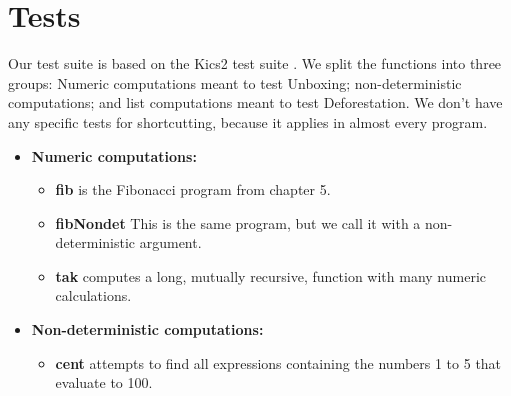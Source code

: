 \documentclass{book}
\theoremstyle{definition}
\begin{document}
\section{Tests}

Our test suite is based on the Kics2 test suite \cite{kics2}.
We split the functions into three groups:
Numeric computations meant to test Unboxing;
non-deterministic computations;
and list computations meant to test Deforestation.
We don't have any specific tests for shortcutting, because it
applies in almost every program.

\begin{itemize}

\item \textbf{Numeric computations:}

\begin{itemize}
\item \textbf{fib} is the Fibonacci program from chapter 5.

\item \textbf{fibNondet} This is the same program, but we call it with a non-deterministic argument.

\item \textbf{tak} computes a long, mutually recursive, function with many numeric calculations.
\end{itemize}

\item \textbf{Non-deterministic computations:}

\begin{itemize}
\item \textbf{cent} attempts to find all expressions
containing the numbers 1 to 5 that evaluate to 100.


\end{itemize}
\end{itemize}
\end{document}
